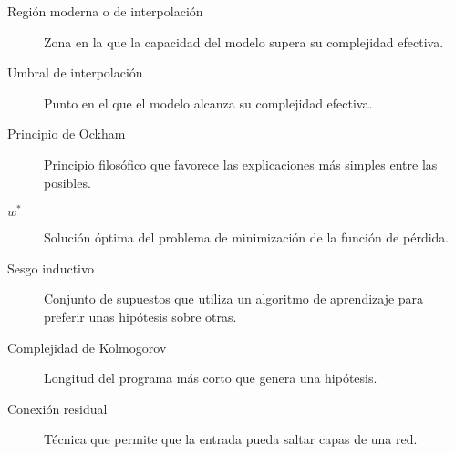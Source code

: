 \begin{description}
  \item[Región moderna o de interpolación] Zona en la que la capacidad del modelo supera su complejidad efectiva.
  \item[Umbral de interpolación] Punto en el que el modelo alcanza su complejidad efectiva.
  \item[Principio de Ockham] Principio filosófico que favorece las explicaciones más simples entre las posibles.
  \item[$w^{*}$] Solución óptima del problema de minimización de la función de pérdida.
  \item[Sesgo inductivo] Conjunto de supuestos que utiliza un algoritmo de aprendizaje para preferir unas hipótesis sobre otras.
  \item[Complejidad de Kolmogorov] Longitud del programa más corto que genera una hipótesis.
  \item[Conexión residual] Técnica que permite que la entrada pueda saltar capas de una red.
\end{description}

\endinput

